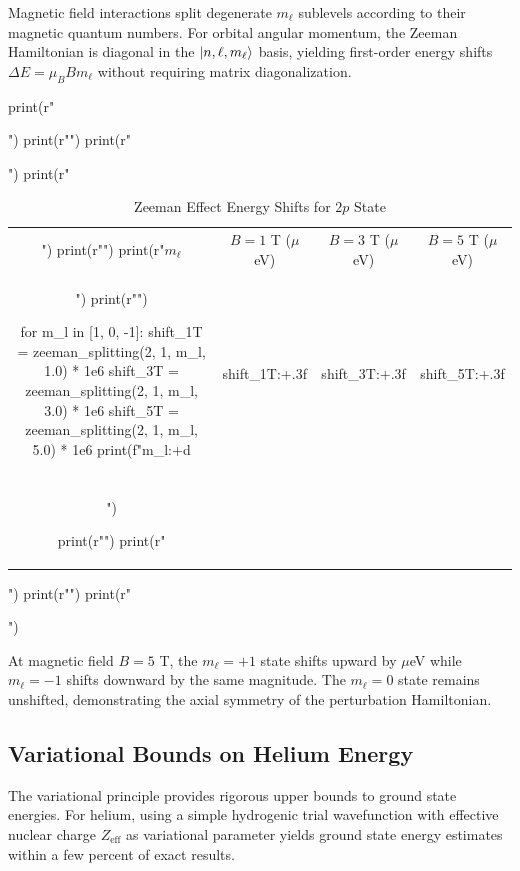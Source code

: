 \documentclass[a4paper, 11pt]{article}
\begin{document}
Magnetic field interactions split degenerate $m_\ell$ sublevels according to
their magnetic quantum numbers. For orbital angular momentum, the Zeeman
Hamiltonian is diagonal in the $\ket{n, \ell, m_\ell}$ basis, yielding
first-order energy shifts $\Delta E = \mu_B B m_\ell$ without requiring
matrix diagonalization.

\begin{pycode}
print(r"\begin{table}[htbp]")
print(r"\centering")
print(r"\caption{Zeeman Effect Energy Shifts for $2p$ State}")
print(r"\begin{tabular}{cccc}")
print(r"\toprule")
print(r"$m_\ell$ & $B = 1$ T ($\mu$eV) & $B = 3$ T ($\mu$eV) & $B = 5$ T ($\mu$eV) \\")
print(r"\midrule")

for m_l in [1, 0, -1]:
    shift_1T = zeeman_splitting(2, 1, m_l, 1.0) * 1e6
    shift_3T = zeeman_splitting(2, 1, m_l, 3.0) * 1e6
    shift_5T = zeeman_splitting(2, 1, m_l, 5.0) * 1e6
    print(f"{m_l:+d} & {shift_1T:+.3f} & {shift_3T:+.3f} & {shift_5T:+.3f} \\\\")

print(r"\bottomrule")
print(r"\end{tabular}")
print(r"\label{tab:zeeman}")
print(r"\end{table}")
\end{pycode}

At magnetic field $B = 5$ T, the $m_\ell = +1$ state shifts upward by
 $\mu$eV while $m_\ell = -1$ shifts downward
by the same magnitude. The $m_\ell = 0$ state remains unshifted, demonstrating
the axial symmetry of the perturbation Hamiltonian.

\subsection{Variational Bounds on Helium Energy}

The variational principle provides rigorous upper bounds to ground state
energies. For helium, using a simple hydrogenic trial wavefunction with
effective nuclear charge $Z_{\text{eff}}$ as variational parameter yields
ground state energy estimates within a few percent of exact results.
\end{document}
